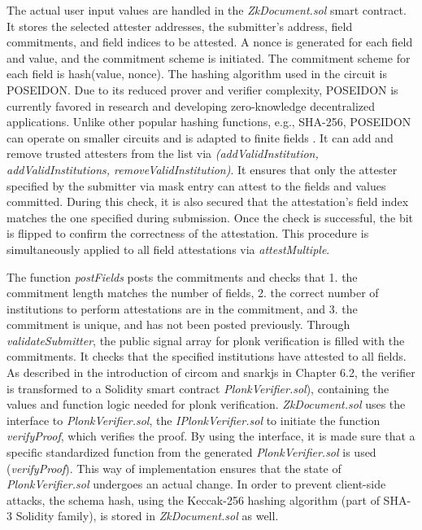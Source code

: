 The actual user input values are handled in the \textit{ZkDocument.sol} smart contract. It stores the selected attester addresses, the submitter's address, field commitments, and field indices to be attested. A nonce is generated for each field and value, and the commitment scheme is initiated. The commitment scheme for each field is hash(value, nonce). The hashing algorithm used in the circuit is POSEIDON. Due to its reduced prover and verifier complexity, POSEIDON is currently favored in research and developing zero-knowledge decentralized applications. Unlike other popular hashing functions, e.g., SHA-256, POSEIDON can operate on smaller circuits and is adapted to finite fields \citep{poseidon}. It can add and remove trusted attesters from the list via \textit{(addValidInstitution, addValidInstitutions, removeValidInstitution)}. It ensures that only the attester specified by the submitter via mask entry can attest to the fields and values committed. During this check, it is also secured that the attestation's field index matches the one specified during submission. Once the check is successful, the bit is flipped to confirm the correctness of the attestation. This procedure is simultaneously applied to all field attestations via \textit{attestMultiple}. 

The function \textit{postFields} posts the commitments and checks that 1. the commitment length matches the number of fields, 2. the correct number of institutions to perform attestations are in the commitment, and 3. the commitment is unique, and has not been posted previously. Through \textit{validateSubmitter}, the public signal array for \acrshort{plonk} verification is filled with the commitments. It checks that the specified institutions have attested to all fields. As described in the introduction of circom and snarkjs in Chapter 6.2, the verifier is transformed to a Solidity smart contract \textit{PlonkVerifier.sol}), containing the values and function logic needed for \acrshort{plonk} verification. \textit{ZkDocument.sol} uses the interface to \textit{PlonkVerifier.sol}, the \textit{IPlonkVerifier.sol} to initiate the function \textit{verifyProof}, which verifies the proof. By using the interface, it is made sure that a specific standardized function from the generated \textit{PlonkVerifier.sol} is used (\textit{verifyProof}). This way of implementation ensures that the state of \textit{PlonkVerifier.sol} undergoes an actual change. In order to prevent client-side attacks, the schema hash, using the Keccak-256 hashing algorithm (part of SHA-3 Solidity family), is stored in \textit{ZkDocument.sol} as well. 


